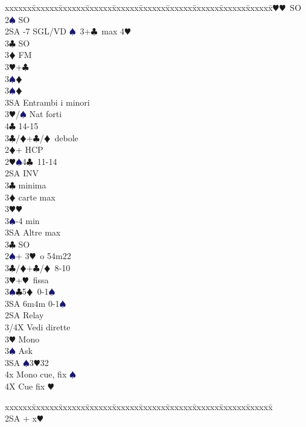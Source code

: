 \documentclass[a4paper,italian]{article}
\newcommand{\BC}{\textcolor{OliveGreen}{$\clubsuit$}}
\newcommand{\BD}{\textcolor{RedOrange}{$\vardiamondsuit$}}
\newcommand{\BH}{\textcolor{Red2}{$\varheartsuit${}}}
\newcommand{\BS}{\textcolor{MidnightBlue}{$\spadesuit${}}}
\newenvironment{bidtable}
{\begin{tabbing}

    xxxxxx\=xxxxxx\=xxxxxx\=xxxxxx\=xxxxxx\=xxxxxx\=xxxxxx\=xxxxxx\=xxxxxx\=xxxxxx\=\kill}
{\end{tabbing} }%
\begin{document}
\begin{multicols}{2}
    \begin{bidtable}
        2\BH {}\BH\ SO\\
        2\BS \> SO\\
        2SA -7 SGL/VD \BS\ 3+\BC\ max 4\BH \+\\
        3\BC \> SO\\
        3\BD \> FM\+\\
        3\BH {}+\BC \+\\
        3\BS {}\BD \-\\
        3\BS {}\BD \\
        3SA \> Entrambi i minori\-\\
        3\BH/\BS \> Nat forti\\
        4\BC {} 14-15\-\\
        3\BC/\BD {}+\BC /\BD\ debole\\
        2\BD {}+ HCP\+\\
        2\BH {}\BS 4\BC\ 11-14\+\\
        2SA \> INV\+\\
        3\BC {} minima\\
        3\BD {} carte max\\
        3\BH {}\BH \\
        3\BS {}-4 min\\
        3SA \> Altre max\-\\
        3\BC \> SO\-\\
        2\BS {}+ 3\BH\ o 54m22\+\\
        3\BC/\BD {}+\BC /\BD\ 8-10\\
        3\BH {}+\BH\ fissa\\
        3\BS {}\BC 5\BD\ 0-1\BS \\
        3SA \> 6m4m 0-1\BS \\
        2SA \> Relay\+\\
        3/4X \> Vedi dirette\\
        3\BH \> Mono\+\\
        3\BS \> Ask\+\\
        3SA \BS 3\BH 32\\
        4x \> Mono cue, fix \BS\-\\
        4X \> Cue fix \BH \-\-\-\\
    \end{bidtable}
    \columnbreak
    \begin{bidtable}
        \+\\
        2SA + x\BH \+\\

\end{bidtable}
\end{multicols}
\end{document}
